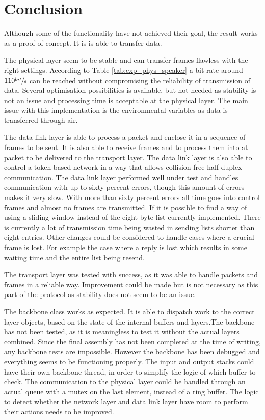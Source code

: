 \chapter{Conclusion}\label{chap:conclusion}
Although some of the functionality have not achieved their goal, the result works as a proof of concept. It is is able to transfer data.

The physical layer seem to be stable and can transfer frames flawless with the right settings. According to Table \ref{tab:exp_phys_speaker} a bit rate around $110\sfrac{bit}{s}$ can be reached without compromising the reliability of transmission of data. Several optimisation possibilities is available, but not needed as stability is not an issue and processing time is acceptable at the physical layer. The main issue with this implementation is the environmental variables as data is transferred through air.

The data link layer is able to process a packet and enclose it in a sequence of frames to be sent. It is also able to receive frames and to process them into at packet to be delivered to the transport layer. The data link layer is also able to control a token based network in a way that allows collision free half duplex communication. The data link layer performed well under test and handles communication with up to sixty percent errors, though this amount of errors makes it very slow. With more than sixty percent errors all time goes into control frames and almost no frames are transmitted.
If it is possible to find a way of using a sliding window instead of the eight byte list currently implemented. There is currently a lot of transmission time being wasted in sending lists shorter than eight entries. Other changes could be considered to handle cases where a crucial frame is lost. For example the case where a reply is lost which results in some waiting time and the entire list being resend.

The transport layer was tested with success, as it was able to handle packets and frames in a reliable way. Improvement could be made but is not necessary as this part of the protocol as stability does not seem to be an issue.

The backbone class works as expected. It is able to dispatch work to the correct layer objects, based on the state of the internal buffers and layers.The backbone has not been tested, as it is meaningless to test it without the actual layers combined. Since the final assembly has not been completed at the time of writing, any backbone tests are impossible. However the backbone has been debugged and everything seems to be functioning properly.
The input and output stacks could have their own backbone thread, in order to simplify the logic of which buffer to check. The communication to the physical layer could be handled through an actual queue with a mutex on the last element, instead of a ring buffer. The logic to detect whether the network layer and data link layer have room to perform their actions needs to be improved.

